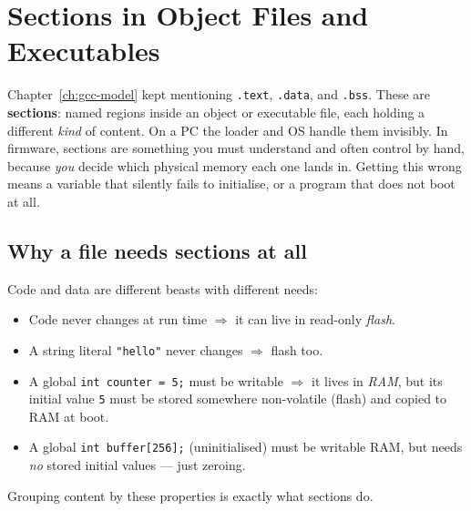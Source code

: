 \documentclass[11pt,a4paper,oneside]{book}
\newcommand{\code}[1]{\texttt{#1}}
\begin{document}
\chapter{Sections in Object Files and Executables}
\label{ch:sections}

Chapter~\ref{ch:gcc-model} kept mentioning \code{.text}, \code{.data}, and
\code{.bss}. These are \textbf{sections}: named regions inside an object or
executable file, each holding a different \emph{kind} of content. On a PC the
loader and OS handle them invisibly. In firmware, sections are something you
must understand and often control by hand, because \emph{you} decide which
physical memory each one lands in. Getting this wrong means a variable that
silently fails to initialise, or a program that does not boot at all.

\section{Why a file needs sections at all}
Code and data are different beasts with different needs:
\begin{itemize}[leftmargin=1.4cm]
  \item Code never changes at run time $\Rightarrow$ it can live in
        read-only \emph{flash}.
  \item A string literal \code{"hello"} never changes $\Rightarrow$ flash too.
  \item A global \code{int counter = 5;} must be writable $\Rightarrow$ it lives
        in \emph{RAM}, but its initial value \code{5} must be stored somewhere
        non-volatile (flash) and copied to RAM at boot.
  \item A global \code{int buffer[256];} (uninitialised) must be writable RAM,
        but needs \emph{no} stored initial values --- just zeroing.
\end{itemize}
Grouping content by these properties is exactly what sections do.
\end{document}
